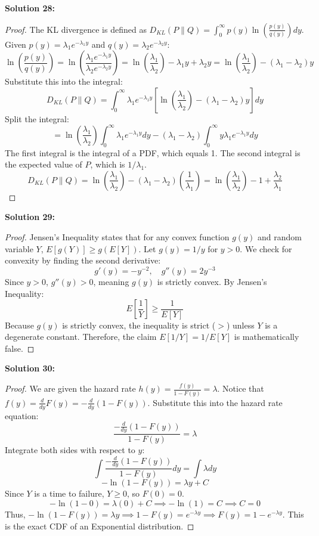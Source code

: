 \documentclass[11pt, a4paper]{article}
\theoremstyle{definition}
\theoremstyle{remark}
\begin{document}
\textbf{Solution 28:}
\begin{proof}
The KL divergence is defined as $D_{KL}(P \parallel Q) = \int_0^\infty p(y) \ln\left(\frac{p(y)}{q(y)}\right) dy$.
Given $p(y) = \lambda_1 e^{-\lambda_1 y}$ and $q(y) = \lambda_2 e^{-\lambda_2 y}$:
\[ \ln\left(\frac{p(y)}{q(y)}\right) = \ln\left(\frac{\lambda_1 e^{-\lambda_1 y}}{\lambda_2 e^{-\lambda_2 y}}\right) = \ln\left(\frac{\lambda_1}{\lambda_2}\right) - \lambda_1 y + \lambda_2 y = \ln\left(\frac{\lambda_1}{\lambda_2}\right) - (\lambda_1 - \lambda_2)y \]
Substitute this into the integral:
\[ D_{KL}(P \parallel Q) = \int_0^\infty \lambda_1 e^{-\lambda_1 y} \left[ \ln\left(\frac{\lambda_1}{\lambda_2}\right) - (\lambda_1 - \lambda_2)y \right] dy \]
Split the integral:
\[ = \ln\left(\frac{\lambda_1}{\lambda_2}\right) \int_0^\infty \lambda_1 e^{-\lambda_1 y} dy - (\lambda_1 - \lambda_2) \int_0^\infty y \lambda_1 e^{-\lambda_1 y} dy \]
The first integral is the integral of a PDF, which equals 1. The second integral is the expected value of $P$, which is $1/\lambda_1$.
\[ D_{KL}(P \parallel Q) = \ln\left(\frac{\lambda_1}{\lambda_2}\right) - (\lambda_1 - \lambda_2)\left(\frac{1}{\lambda_1}\right) = \ln\left(\frac{\lambda_1}{\lambda_2}\right) - 1 + \frac{\lambda_2}{\lambda_1} \]
\end{proof}

\textbf{Solution 29:}
\begin{proof}
Jensen's Inequality states that for any convex function $g(y)$ and random variable $Y$, $E[g(Y)] \ge g(E[Y])$.
Let $g(y) = 1/y$ for $y > 0$. We check for convexity by finding the second derivative:
\[ g'(y) = -y^{-2}, \quad g''(y) = 2y^{-3} \]
Since $y > 0$, $g''(y) > 0$, meaning $g(y)$ is strictly convex.
By Jensen's Inequality:
\[ E\left[\frac{1}{Y}\right] \ge \frac{1}{E[Y]} \]
Because $g(y)$ is strictly convex, the inequality is strict ($>$) unless $Y$ is a degenerate constant. Therefore, the claim $E[1/Y] = 1/E[Y]$ is mathematically false.
\end{proof}

\textbf{Solution 30:}
\begin{proof}
We are given the hazard rate $h(y) = \frac{f(y)}{1-F(y)} = \lambda$.
Notice that $f(y) = \frac{d}{dy} F(y) = -\frac{d}{dy} (1-F(y))$.
Substitute this into the hazard rate equation:
\[ \frac{-\frac{d}{dy} (1-F(y))}{1-F(y)} = \lambda \]
Integrate both sides with respect to $y$:
\[ \int \frac{-\frac{d}{dy} (1-F(y))}{1-F(y)} dy = \int \lambda dy \]
\[ -\ln(1-F(y)) = \lambda y + C \]
Since $Y$ is a time to failure, $Y \ge 0$, so $F(0) = 0$.
\[ -\ln(1-0) = \lambda(0) + C \implies -\ln(1) = C \implies C = 0 \]
Thus, $-\ln(1-F(y)) = \lambda y \implies 1-F(y) = e^{-\lambda y} \implies F(y) = 1 - e^{-\lambda y}$.
This is the exact CDF of an Exponential distribution.
\end{proof}
\end{document}
